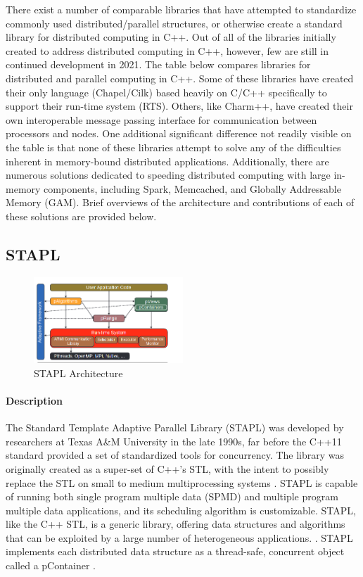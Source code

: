 There exist a number of comparable libraries that have attempted to standardize commonly used distributed/parallel structures, or otherwise create a standard library for distributed computing in C++. Out of all of the libraries initially created to address distributed computing in C++, however, few are still in continued development in 2021. The table below compares libraries for distributed and parallel computing in C++. Some of these libraries have created their only language (Chapel/Cilk) based heavily on C/C++ specifically to support their run-time system (RTS). Others, like Charm++, have created their own interoperable message passing interface for communication between processors and nodes.  One additional significant difference not readily visible on the table is that none of these libraries attempt to solve any of the difficulties inherent in memory-bound distributed applications. Additionally, there are numerous solutions dedicated to speeding distributed computing with large in-memory components, including Spark, Memcached, and Globally Addressable Memory (GAM). Brief overviews of the architecture and contributions of each of these solutions are provided below.   

\subsection{STAPL}
\begin{figure}[h]
\centering
\includegraphics[width=0.5\textwidth]{Figures/stapl_overview.png}
\caption{STAPL Architecture \cite{stapl_parallel_container}}
\label{fig:stapl_arch}
\end{figure}
\paragraph{Description} 
The Standard Template Adaptive Parallel Library (STAPL) was developed by researchers at Texas A\&M University in the late 1990s, far before the C++11 standard provided a set of standardized tools for concurrency. The library was originally created as a super-set of C++'s STL, with the intent to possibly replace the STL on small to medium multiprocessing systems \cite{STAPL}. STAPL is capable of running both single program multiple data (SPMD) and multiple program multiple data applications, and its scheduling algorithm is customizable. STAPL, like the C++ STL, is a generic library, offering data structures and algorithms that can be exploited by a large number of heterogeneous applications. \cite{STAPL}. STAPL implements each distributed data structure as a thread-safe, concurrent object called a pContainer \cite{stapl_parallel_container}. 

